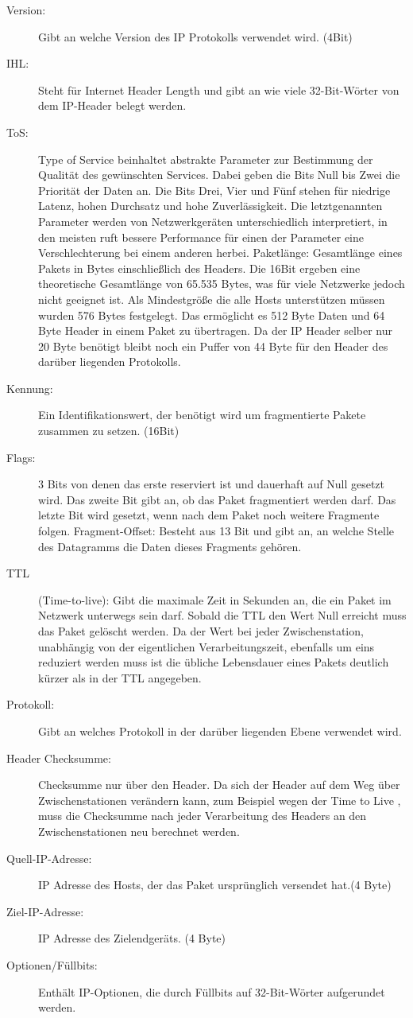 \begin{description}


\item[Version: ]Gibt an welche Version des IP Protokolls verwendet wird. (4Bit)
\item[IHL: ]Steht für Internet Header Length und gibt an wie viele 32-Bit-Wörter von dem IP-Header belegt werden.
\item[ToS: ]Type of Service beinhaltet abstrakte Parameter zur Bestimmung der Qualität des gewünschten Services. Dabei geben die Bits Null bis Zwei die Priorität der Daten an. Die Bits Drei, Vier und Fünf stehen für niedrige Latenz, hohen Durchsatz und hohe Zuverlässigkeit. Die letztgenannten Parameter werden von Netzwerkgeräten unterschiedlich interpretiert, in den meisten ruft bessere Performance für einen der Parameter eine Verschlechterung bei einem anderen herbei.
Paketlänge: Gesamtlänge eines Pakets in Bytes einschließlich des Headers. Die 16Bit ergeben eine theoretische Gesamtlänge von 65.535 Bytes, was für viele Netzwerke jedoch nicht geeignet ist. Als Mindestgröße die alle Hosts unterstützen müssen wurden 576 Bytes festgelegt. Das ermöglicht es 512 Byte Daten und 64 Byte Header in einem Paket zu übertragen. Da der IP Header selber nur 20 Byte benötigt bleibt noch ein Puffer von 44 Byte für den Header des darüber liegenden Protokolls.  
\item[Kennung: ]Ein Identifikationswert, der benötigt wird um fragmentierte Pakete zusammen zu setzen.  (16Bit) 
\item[Flags: ]3 Bits von denen das erste reserviert ist und dauerhaft auf Null gesetzt wird. Das zweite Bit gibt an, ob das Paket fragmentiert werden darf. Das letzte Bit wird gesetzt, wenn nach dem Paket noch weitere Fragmente folgen.
Fragment-Offset: Besteht aus 13 Bit und gibt an, an welche Stelle des Datagramms die Daten dieses Fragments gehören. 
\item[TTL ](Time-to-live): Gibt die maximale Zeit in Sekunden an, die ein Paket im Netzwerk unterwegs sein darf. Sobald die TTL den Wert Null erreicht muss das Paket gelöscht werden. Da der Wert bei jeder Zwischenstation, unabhängig von der eigentlichen Verarbeitungszeit, ebenfalls um eins reduziert werden muss ist die übliche Lebensdauer eines Pakets deutlich kürzer als in der TTL angegeben. 
\item[Protokoll: ]Gibt an welches Protokoll in der darüber liegenden Ebene verwendet wird.
\item[Header Checksumme: ]Checksumme nur über den Header. Da sich der Header auf dem Weg über Zwischenstationen verändern kann, zum Beispiel wegen der Time to Live , muss die Checksumme nach jeder Verarbeitung des Headers an den Zwischenstationen neu berechnet werden.
\item[Quell-IP-Adresse: ]IP Adresse des Hosts, der das Paket ursprünglich versendet hat.(4 Byte)
\item[Ziel-IP-Adresse: ]IP Adresse des Zielendgeräts. (4 Byte)
\item[Optionen/Füllbits: ] Enthält IP-Optionen, die durch Füllbits auf 32-Bit-Wörter aufgerundet werden.
\end{description}

